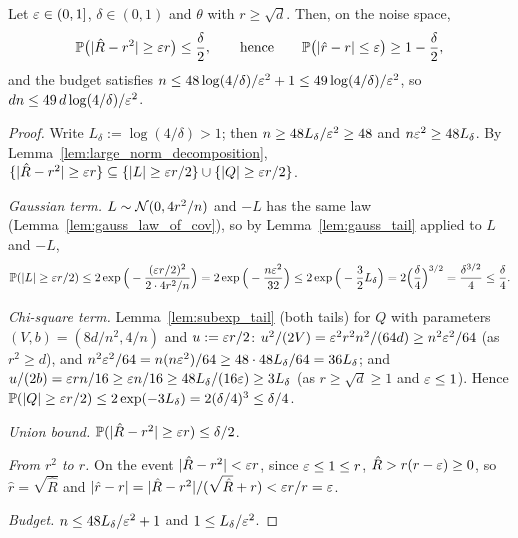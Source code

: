\begin{theorem}\label{thm:large_norm_guarantee}
\leanok
{}
Let $\varepsilon \in (0,1]$, $\delta \in (0,1)$ and $\theta$ with $r \ge \sqrt d$. Then, on the noise
space,
\[
  \mathbb{P}\big( \lvert \hat R - r^2 \rvert \ge \varepsilon r \big) \le \frac{\delta}{2},
  \qquad\text{hence}\qquad
  \mathbb{P}\big( \lvert \hat r - r \rvert \le \varepsilon \big) \ge 1 - \frac{\delta}{2},
\]
and the budget satisfies $n \le 48\log(4/\delta)/\varepsilon^2 + 1 \le 49\log(4/\delta)/\varepsilon^2$,
so $dn \le 49\,d\log(4/\delta)/\varepsilon^2$.
\end{theorem}

\begin{proof}
\leanok
{}
Write $L_\delta := \log(4/\delta) > 1$; then $n \ge 48L_\delta/\varepsilon^2 \ge 48$ and
$n\varepsilon^2 \ge 48L_\delta$. By Lemma~\ref{lem:large_norm_decomposition},
$\{|\hat R - r^2| \ge \varepsilon r\} \subseteq \{|L| \ge \varepsilon r/2\} \cup \{|Q| \ge \varepsilon r/2\}$.

\emph{Gaussian term.} $L \sim \mathcal{N}(0, 4r^2/n)$ and $-L$ has the same law
(Lemma~\ref{lem:gauss_law_of_cov}), so by Lemma~\ref{lem:gauss_tail} applied to $L$ and $-L$,
\[
  \mathbb{P}(|L| \ge \varepsilon r/2) \le 2\exp\Big( -\frac{(\varepsilon r/2)^2}{2\cdot 4r^2/n} \Big)
  = 2\exp\Big( -\frac{n\varepsilon^2}{32} \Big)
  \le 2\exp\Big( -\frac{3}{2}L_\delta \Big) = 2\Big(\frac{\delta}{4}\Big)^{3/2}
  = \frac{\delta^{3/2}}{4} \le \frac{\delta}{4}.
\]

\emph{Chi-square term.} Lemma~\ref{lem:subexp_tail} (both tails) for $Q$ with parameters
$(V,b) = (8d/n^2, 4/n)$ and $u := \varepsilon r/2$:
$u^2/(2V) = \varepsilon^2r^2n^2/(64d) \ge n^2\varepsilon^2/64$ (as $r^2 \ge d$), and
$n^2\varepsilon^2/64 = n(n\varepsilon^2)/64 \ge 48\cdot 48 L_\delta/64 = 36L_\delta$; and
$u/(2b) = \varepsilon r n/16 \ge \varepsilon n/16 \ge 48L_\delta/(16\varepsilon) \ge 3L_\delta$ (as
$r \ge \sqrt d \ge 1$ and $\varepsilon \le 1$). Hence
$\mathbb{P}(|Q| \ge \varepsilon r/2) \le 2\exp(-3L_\delta) = 2(\delta/4)^3 \le \delta/4$.

\emph{Union bound.} $\mathbb{P}(|\hat R - r^2| \ge \varepsilon r) \le \delta/2$.

\emph{From $r^2$ to $r$.} On the event $|\hat R - r^2| < \varepsilon r$, since $\varepsilon \le 1 \le r$,
$\hat R > r(r - \varepsilon) \ge 0$, so $\hat r = \sqrt{\hat R}$ and
$|\hat r - r| = |\hat R - r^2|/(\sqrt{\hat R} + r) < \varepsilon r/r = \varepsilon$.

\emph{Budget.} $n \le 48L_\delta/\varepsilon^2 + 1$ and $1 \le L_\delta/\varepsilon^2$.
\end{proof}

